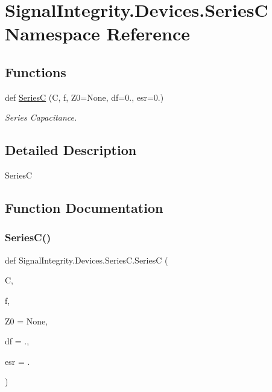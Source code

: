 \hypertarget{namespaceSignalIntegrity_1_1Devices_1_1SeriesC}{}\section{Signal\+Integrity.\+Devices.\+SeriesC Namespace Reference}
\label{namespaceSignalIntegrity_1_1Devices_1_1SeriesC}
\subsection*{Functions}
\begin{DoxyCompactItemize}
\item 
def \hyperlink{namespaceSignalIntegrity_1_1Devices_1_1SeriesC_a4a62a937e8732ab6a8462ddb910437ea}{SeriesC} (C, f, Z0=None, df=0., esr=0.)
\begin{DoxyCompactList}\small\item\em Series Capacitance. \end{DoxyCompactList}\end{DoxyCompactItemize}


\subsection{Detailed Description}
\begin{DoxyVerb}SeriesC\end{DoxyVerb}
 

\subsection{Function Documentation}
\mbox{\label{namespaceSignalIntegrity_1_1Devices_1_1SeriesC_a4a62a937e8732ab6a8462ddb910437ea}} 
\subsubsection{\texorpdfstring{Series\+C()}{SeriesC()}}
{\footnotesize\ttfamily def Signal\+Integrity.\+Devices.\+Series\+C.\+SeriesC (\begin{DoxyParamCaption}\item[{}]{C,  }\item[{}]{f,  }\item[{}]{Z0 = {\ttfamily None},  }\item[{}]{df = {.},  }\item[{}]{esr = {.} }\end{DoxyParamCaption})}



